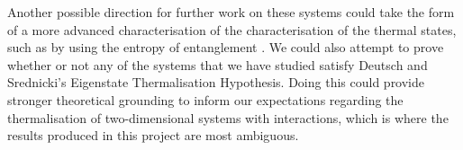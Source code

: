\documentclass[a4paper, 10pt]{article}
\theoremstyle{plain}
\begin{document}
Another possible direction for further work on these systems could take the 
form of a more advanced characterisation of the characterisation of the 
thermal states, such as by using the entropy of entanglement 
. We could also attempt to prove whether or not
any of the systems that we have studied satisfy Deutsch and Srednicki's 
Eigenstate Thermalisation Hypothesis. Doing this could provide stronger
theoretical grounding to inform our expectations regarding the thermalisation
of two-dimensional systems with interactions, which is where the results 
produced in this project are most ambiguous.


\newpage





\end{document}
